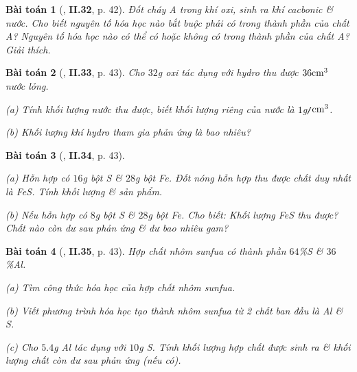 \documentclass{article}
\numberwithin{equation}{section}
\newtheorem{baitoan}{Bài toán}
\begin{document}
\begin{baitoan}[\cite{Truong_BTNC_Hoa_Hoc_8_2022}, \textbf{II.32}, p. 42]
	Đốt cháy A trong khí oxi, sinh ra khí cacbonic \& nước. Cho biết nguyên tố hóa học nào bắt buộc phải có trong thành phần của chất A? Nguyên tố hóa học nào có thể có hoặc không có trong thành phần của chất A? Giải thích.
\end{baitoan}

\begin{baitoan}[\cite{Truong_BTNC_Hoa_Hoc_8_2022}, \textbf{II.33}, p. 43]
	Cho $32$\emph{g} oxi tác dụng với hydro thu được $\rm36cm^3$ nước lỏng. 
	\begin{enumerate*}
		\item[(a)] Tính khối lượng nước thu được, biết khối lượng riêng của nước là $1$\emph{g\texttt{/}$\rm cm^3$}.
		\item[(b)] Khối lượng khí hydro tham gia phản ứng là bao nhiêu?
	\end{enumerate*}
\end{baitoan}

\begin{baitoan}[\cite{Truong_BTNC_Hoa_Hoc_8_2022}, \textbf{II.34}, p. 43]
	\begin{enumerate*}
		\item[(a)] Hỗn hợp có $16$\emph{g} bột \emph{S} \& $28$\emph{g} bột \emph{Fe}. Đốt nóng hỗn hợp thu được chất duy nhất là \emph{FeS}. Tính khối lượng \& sản phẩm.
		\item[(b)] Nếu hỗn hợp có $8$\emph{g} bột \emph{S} \& $28$\emph{g} bột \emph{Fe}. Cho biết: Khối lượng \emph{FeS} thu được? Chất nào còn dư sau phản ứng \& dư bao nhiêu gam?
	\end{enumerate*}
\end{baitoan}

\begin{baitoan}[\cite{Truong_BTNC_Hoa_Hoc_8_2022}, \textbf{II.35}, p. 43]
	Hợp chất nhôm sunfua có thành phần $64$\%\emph{S} \& $36$\%\emph{Al}.
	\begin{enumerate*}
		\item[(a)] Tìm công thức hóa học của hợp chất nhôm sunfua.
		\item[(b)] Viết phương trình hóa học tạo thành nhôm sunfua từ 2 chất ban đầu là \emph{Al} \& \emph{S}.
		\item[(c)] Cho $5.4$\emph{g Al} tác dụng với $10$\emph{g S}. Tính khối lượng hợp chất được sinh ra \& khối lượng chất còn dư sau phản ứng (nếu có).
	\end{enumerate*}
\end{baitoan}


\printbibliography[heading=bibintoc]
	
\end{document}
